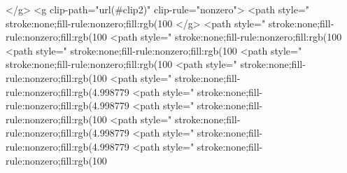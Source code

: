 </g>
<g clip-path="url(#clip2)" clip-rule="nonzero">
<path style=" stroke:none;fill-rule:nonzero;fill:rgb(100%
</g>
<path style=" stroke:none;fill-rule:nonzero;fill:rgb(100%
<path style=" stroke:none;fill-rule:nonzero;fill:rgb(100%
<path style=" stroke:none;fill-rule:nonzero;fill:rgb(100%
<path style=" stroke:none;fill-rule:nonzero;fill:rgb(100%
<path style=" stroke:none;fill-rule:nonzero;fill:rgb(100%
<path style=" stroke:none;fill-rule:nonzero;fill:rgb(4.998779%
<path style=" stroke:none;fill-rule:nonzero;fill:rgb(4.998779%
<path style=" stroke:none;fill-rule:nonzero;fill:rgb(100%
<path style=" stroke:none;fill-rule:nonzero;fill:rgb(4.998779%
<path style=" stroke:none;fill-rule:nonzero;fill:rgb(4.998779%
<path style=" stroke:none;fill-rule:nonzero;fill:rgb(100%
